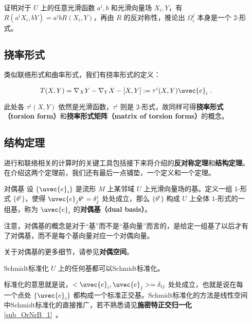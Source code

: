 \begin{exercise}{}
证明对于 $U$ 上的任意光滑函数 $a^i, b$ 和光滑向量场 $X_i, Y$，有 $R(a^iX_i, bY)=a^ibR(X_i, Y)$，再由 $R$ 的反对称性，推论出 $\Omega^j_i$ 本身是一个 $2$-形式。
\end{exercise}

\subsection{挠率形式}


类似联络形式和曲率形式，我们有挠率形式的定义：

\begin{equation}
T(X, Y)=\nabla_XY-\nabla_YX-[X, Y]:=\tau^i(X, Y)\uvec{e}_i~.
\end{equation}

此处各 $\tau^i(X, Y)$ 依然是光滑函数，$\tau^i$ 则是 $2$-形式，故同样可得\textbf{挠率形式（torsion form）}和\textbf{挠率形式矩阵（matrix of torsion forms）}的概念。





\subsection{结构定理}

进行和联络相关的计算时的关键工具包括接下来将介绍的\textbf{反对称定理}和\textbf{结构定理}。在介绍这两个定理前，我们还有最后一点铺垫，一个定义和一个定理。


\begin{definition}{对偶基}
设 $\{\uvec{e}_i\}$ 是流形 $M$ 上某邻域 $U$ 上光滑向量场的基。定义一组 $1$-形式 $\{\theta^i\}$，使得 $\uvec{e}_j\theta^i=\delta^i_j$ 处处成立，那么 $\{\theta^i\}$ 构成 $U$ 上全体 $1$-形式的一组基，称为 $\uvec{e}_i$ 的\textbf{对偶基（dual basis）}。
\end{definition}


注意，对偶基的概念是对于“基”而不是“基向量”而言的，是给定一组基了以后才有了对偶基，而不是每个基向量对应一个对偶向量。

关于对偶基的更多细节，请参见\textbf{对偶空间}。


\begin{theorem}{Schmidt标准化}
$U$ 上的任何基都可以Schmidt标准化。
\end{theorem}

标准化的意思就是说，$<\uvec{e}_i, \uvec{e}_j>=\delta_{ij}$ 处处成立，也就是说在每一个点处 $\{\uvec{e}_i\}$ 都构成一个标准正交基。Schmidt标准化的方法是线性空间中Schmidt标准化的直接推广，若不熟悉请见\textbf{施密特正交归一化}\autoref{sub_OrNrB_1}~。

